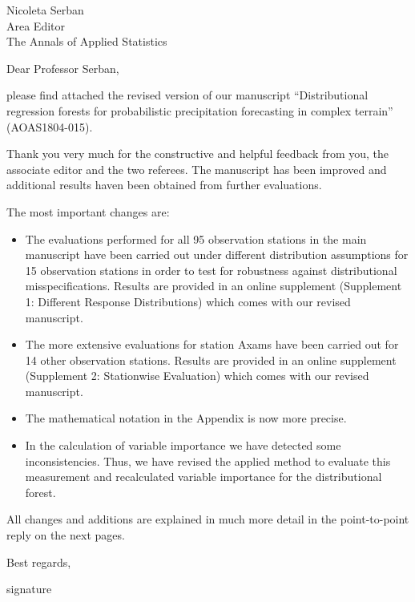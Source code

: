 \documentclass[american,foldmarks=false,noconfig]{uibklttr}
\begin{document}
\begin{letter}{
Nicoleta Serban\\
Area Editor\\
The Annals of Applied Statistics}



\opening{Dear Professor Serban,}

please find attached the revised version of our manuscript 
``Distributional regression forests for probabilistic precipitation 
forecasting in complex terrain'' (AOAS1804-015).

Thank you very much for the constructive and helpful feedback from you, 
the associate editor and the two referees. The manuscript has been 
improved and additional results haven been obtained from further evaluations.

The most important changes are:
\begin{itemize}

\item The evaluations performed for all 95 observation stations 
in the main manuscript have been carried out under different 
distribution assumptions for 15 observation stations in order to 
test for robustness against distributional misspecifications. 
Results are provided in an online supplement 
(Supplement 1: Different Response Distributions) 
which comes with our revised manuscript.

\item The more extensive evaluations for station Axams have been 
carried out for 14 other observation stations. Results are 
provided in an online supplement 
(Supplement 2: Stationwise Evaluation)
which comes with our revised manuscript.

\item The mathematical notation in the Appendix is now more precise.

\item In the calculation of variable importance we have detected some inconsistencies.
Thus, we have revised the applied method to evaluate this measurement and recalculated
variable importance for the distributional forest.

\end{itemize}

All changes and additions are explained in much more detail in the
point-to-point reply on the next pages. 

\closing{Best regards,
\vspace*{1cm}
}

\vspace*{-2.8cm}
\hspace*{-0.3cm}signature %

\end{letter}
\end{document}
